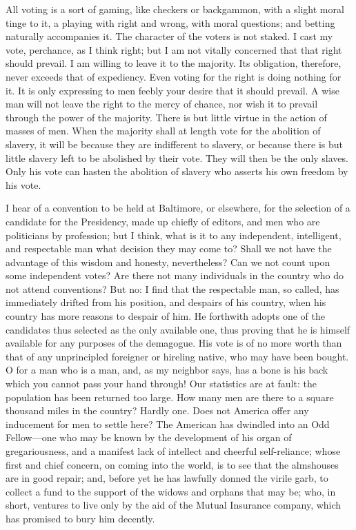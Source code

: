 \documentclass[letterpaper,12pt]{article}
\begin{document}
All voting is a sort of gaming, like checkers or backgammon, with a slight moral
tinge to it, a playing with right and wrong, with moral questions; and betting
naturally accompanies it. The character of the voters is not staked. I cast my
vote, perchance, as I think right; but I am not vitally concerned that that
right should prevail. I am willing to leave it to the majority. Its obligation,
therefore, never exceeds that of expediency. Even voting for the right is doing
nothing for it. It is only expressing to men feebly your desire that it should
prevail. A wise man will not leave the right to the mercy of chance, nor wish it
to prevail through the power of the majority. There is but little virtue in the
action of masses of men. When the majority shall at length vote for the
abolition of slavery, it will be because they are indifferent to slavery, or
because there is but little slavery left to be abolished by their vote. They
will then be the only slaves. Only his vote can hasten the abolition of slavery
who asserts his own freedom by his vote.

I hear of a convention to be held at Baltimore, or elsewhere, for the selection
of a candidate for the Presidency, made up chiefly of editors, and men who are
politicians by profession; but I think, what is it to any independent,
intelligent, and respectable man what decision they may come to? Shall we not
have the advantage of this wisdom and honesty, nevertheless? Can we not count
upon some independent votes? Are there not many individuals in the country who
do not attend conventions? But no: I find that the respectable man, so called,
has immediately drifted from his position, and despairs of his country, when his
country has more reasons to despair of him. He forthwith adopts one of the
candidates thus selected as the only available one, thus proving that he is
himself available for any purposes of the demagogue. His vote is of no more
worth than that of any unprincipled foreigner or hireling native, who may have
been bought. O for a man who is a man, and, as my neighbor says, has a bone is
his back which you cannot pass your hand through! Our statistics are at fault:
the population has been returned too large. How many men are there to a square
thousand miles in the country? Hardly one. Does not America offer any inducement
for men to settle here? The American has dwindled into an Odd Fellow---one who
may be known by the development of his organ of gregariousness, and a manifest
lack of intellect and cheerful self-reliance; whose first and chief concern, on
coming into the world, is to see that the almshouses are in good repair; and,
before yet he has lawfully donned the virile garb, to collect a fund to the
support of the widows and orphans that may be; who, in short, ventures to live
only by the aid of the Mutual Insurance company, which has promised to bury him
decently.
\end{document}
